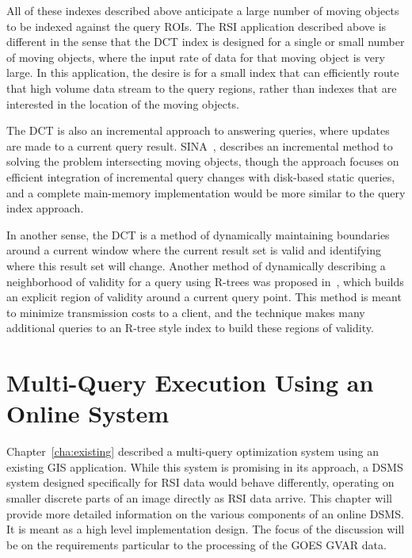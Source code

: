 \documentclass{ucdthesis}       %
\begin{document}
All of these indexes described above anticipate a large number of
moving objects to be indexed against the query \acp{ROI}.  The \acs{RSI}
application described above is different in the sense that the \ac{DCT}
index is designed for a single or small number of moving objects,
where the input rate of data for that moving object is very large.  In
this application, the desire is for a small index that can efficiently
route that high volume data stream to the query regions, rather than
indexes that are interested in the location of the moving objects.

The \ac{DCT} is also an incremental approach to answering queries, where
updates are made to a current query result.  SINA~\cite{mokbel04sina},
describes an incremental method to solving the problem intersecting
moving objects, though the approach focuses on efficient integration
of incremental query changes with disk-based static queries, and a
complete main-memory implementation would be more similar to the query
index approach.

In another sense, the \ac{DCT} is a method of dynamically maintaining
boundaries around a current window where the current result set is
valid and identifying where this result set will change.  Another
method of dynamically describing a neighborhood of validity for a
query using R-trees was proposed in~\cite{zhang03locat},
 which builds an explicit region of validity around a current query
point.  This method is meant to minimize transmission costs to a
client, and the technique makes many additional queries to an R-tree
style index to build these regions of validity.


\chapter{Multi-Query Execution Using an Online System}
\label{cha:operators}


Chapter~\ref{cha:existing} described a multi-query optimization system
using an existing \ac{GIS} application.  While this system is
promising in its approach, a \ac{DSMS} system designed specifically
for \ac{RSI} data would behave differently, operating on smaller
discrete parts of an image directly as \ac{RSI} data arrive.  This
chapter will provide more detailed information on the various
components of an online \ac{DSMS}.  It is meant as a high level
implementation design.  The focus of the discussion will be on the
requirements particular to the processing of the \ac{GOES} \ac{GVAR}
data.
\end{document}
